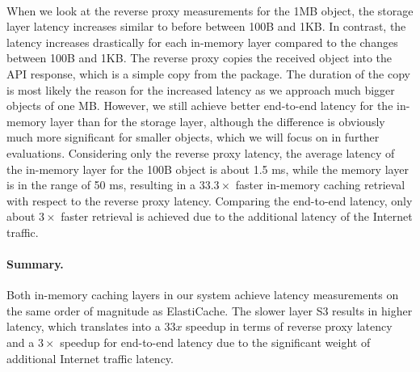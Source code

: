 ~\\
When we look at the reverse proxy measurements for the 1MB object, the storage layer latency increases similar to before between 100B and 1KB. In contrast, the latency increases drastically for each in-memory layer compared to the changes between 100B and 1KB. The reverse proxy copies the received object into the API response, which is a simple copy from the  package. The duration of the copy is most likely the reason for the increased latency as we approach much bigger objects of one MB. However, we still achieve better end-to-end latency for the in-memory layer than for the storage layer, although the difference is obviously much more significant for smaller objects, which we will focus on in further evaluations. Considering only the reverse proxy latency, the average latency of the in-memory layer for the 100B object is about 1.5 ms, while the memory layer is in the range of 50 ms, resulting in a $33.3\times$ faster in-memory caching retrieval with respect to the reverse proxy latency. Comparing the end-to-end latency, only about $3\times$ faster retrieval is achieved due to the additional latency of the Internet traffic.

\paragraph{Summary.} Both in-memory caching layers in our system achieve latency measurements on the same order of magnitude as ElastiCache. The slower layer S3 results in higher latency, which translates into a $33x$ speedup in terms of reverse proxy latency and a $3\times$ speedup for end-to-end latency due to the significant weight of additional Internet traffic latency. 

